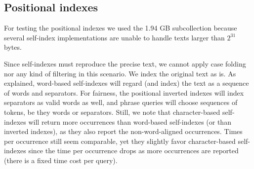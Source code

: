 \documentclass[review]{elsarticle}
\begin{document}
\subsection{Positional indexes}

For testing the positional indexes we used the 1.94 GB subcollection 
because several self-index implementations are unable to handle 
texts larger than $2^{31}$ bytes. 

Since self-indexes must reproduce the precise text, we cannot apply case
folding nor any kind of filtering in this scenario. We index the original text
as is. As explained, word-based self-indexes will regard (and index) the text 
as a sequence of words and separators. For fairness, the positional inverted 
indexes will index separators as valid words as well, and phrase queries will 
choose sequences of tokens, be they words or separators. Still, we note that
character-based self-indexes will return more occurrences than word-based
self-indexes (or than inverted indexes), as they also report the
non-word-aligned occurrences. Times per occurrence still seem comparable, yet
they slightly favor character-based self-indexes since
the time per occurrence drops as more occurrences are reported (there is a
fixed time cost per query). 
\end{document}
